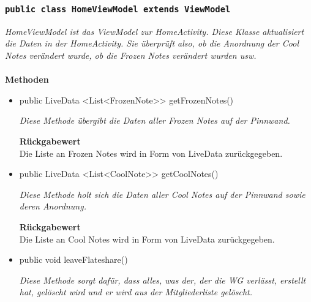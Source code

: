              
            		\subsubsection{\texttt{public class HomeViewModel extends ViewModel}}
        \textit{HomeViewModel ist das ViewModel zur HomeActivity. Diese Klasse aktualisiert die Daten in der HomeActivity. Sie überprüft also, ob die Anordnung der Cool Notes verändert wurde, ob die Frozen Notes verändert wurden usw.}\\      
        \\
		\textbf{Methoden} \\
 			\begin{itemize}
        		\item{public LiveData <List<FrozenNote>> getFrozenNotes()}
        	
        		\textit{Diese Methode übergibt die Daten aller Frozen Notes auf der Pinnwand.}
        		
        		\textbf{Rückgabewert} \\
				Die Liste an Frozen Notes wird in Form von LiveData zurückgegeben.
        	
        		\item{public LiveData <List<CoolNote>> getCoolNotes()}

        		\textit{Diese Methode holt sich die Daten aller Cool Notes auf der Pinnwand sowie deren Anordnung.}
        		
        		\textbf{Rückgabewert} \\
				Die Liste an Cool Notes wird in Form von LiveData zurückgegeben.
				
				\item{public void leaveFlateshare()}
        	
        		\textit{Diese Methode sorgt dafür, dass alles, was der, der die WG verlässt, erstellt hat, gelöscht wird und er wird aus der Mitgliederliste gelöscht.}
        		
       		 \end{itemize}
             
             
